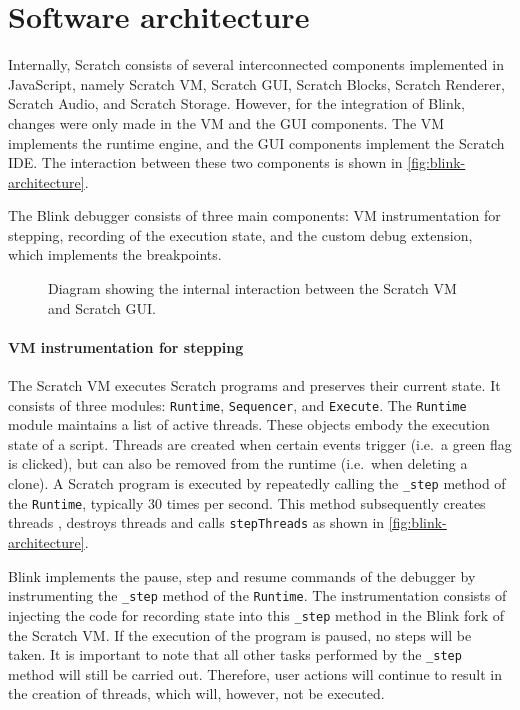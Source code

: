 \documentclass[../main]{subfiles}
\begin{document}
\section{Software architecture}\label{sec:blink-software-architecture}

Internally, Scratch consists of several interconnected components implemented in JavaScript, namely Scratch VM, Scratch GUI, Scratch Blocks, Scratch Renderer, Scratch Audio, and Scratch Storage.
However, for the integration of Blink, changes were only made in the VM and the GUI components.
The VM implements the runtime engine, and the GUI components implement the Scratch IDE\@.
The interaction between these two components is shown in \vref{fig:blink-architecture}.

The Blink debugger consists of three main components: VM instrumentation for stepping, recording of the execution state, and the custom debug extension, which implements the breakpoints.

\begin{figure}
    
    \caption{
        Diagram showing the internal interaction between the Scratch VM and Scratch GUI\@.
    }
    \label{fig:blink-architecture}
\end{figure}

\paragraph{VM instrumentation for stepping}

The Scratch VM executes Scratch programs and preserves their current state.
It consists of three modules: \texttt{Runtime}, \texttt{Sequencer}, and \texttt{Execute}.
The \texttt{Runtime} module maintains a list of active threads.
These objects embody the execution state of a script.
Threads are created when certain events trigger (i.e.\ a green flag is clicked), but can also be removed from the runtime (i.e.\ when deleting a clone).
A Scratch program is executed by repeatedly calling the \texttt{\_step} method of the \texttt{Runtime}, typically 30 times per second.
This method subsequently creates threads , destroys threads  and calls \texttt{stepThreads}  as shown in \vref{fig:blink-architecture}.

Blink implements the pause, step and resume commands of the debugger by instrumenting the \texttt{\_step} method of the \texttt{Runtime}.
The instrumentation consists of injecting the code for recording state into this \texttt{\_step} method in the Blink fork of the Scratch VM\@.
If the execution of the program is paused, no steps will be taken.
It is important to note that all other tasks performed by the \texttt{\_step} method will still be carried out.
Therefore, user actions will continue to result in the creation of threads, which will, however, not be executed.
\end{document}
